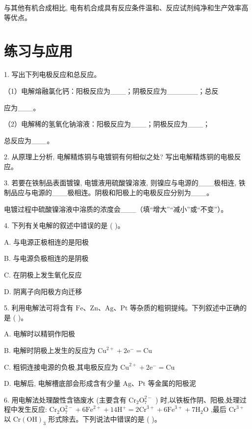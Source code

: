 \documentclass[10pt]{article}
\begin{document}
与其他有机合成相比, 电有机合成具有反应条件温和、反应试剂纯净和生产效率高等优点。

\section*{练习与应用}

1. 写出下列电极反应和总反应。

（1）电解熔融氯化钙：阳极反应为\_\_\_；阴极反应为\_\_\_\_\_\_；总反

应为\_\_\_。

（2）电解稀的氢氧化钠溶液：阳极反应为\_\_\_；阴极反应为\_\_\_；

总反应为\_\_\_。

2. 从原理上分析, 电解精炼铜与电镀铜有何相似之处? 写出电解精炼铜的电极反应。

3. 若要在铁制品表面镀镍, 电镀液用硫酸镍溶液, 则镍应与电源的\_\_\_极相连, 铁制品应与电源的\_\_\_极相连。阴极和阳极上的电极反应分别为\_\_\_。

电镀过程中硫酸镍溶液中溶质的浓度会\_\_\_（填“增大”“减小”或“不变”）。

4. 下列有关电解的叙述中错误的是 ( )。

A. 与电源正极相连的是阳极

B. 与电源负极相连的是阴极

C. 在阴极上发生氧化反应

D. 阴离子向阳极方向迁移

5. 利用电解法可将含有 \(\mathrm{{Fe}}\text{、}\mathrm{{Zn}}\text{、}\mathrm{{Ag}}\text{、}\mathrm{{Pt}}\) 等杂质的粗铜提纯。下列叙述中正确的是 ( )。

A. 电解时以精铜作阳极

B. 电解时阴极上发生的反应为 \({\mathrm{{Cu}}}^{2 + } + 2{\mathrm{e}}^{ - } = \mathrm{{Cu}}\)

C. 粗铜连接电源的负极,其电极反应为 \({\mathrm{{Cu}}}^{2 + } + 2{\mathrm{e}}^{ - } = \mathrm{{Cu}}\)

D. 电解后, 电解槽底部会形成含有少量 \(\mathrm{{Ag}}\text{、}\mathrm{{Pt}}\) 等金属的阳极泥

6. 用电解法处理酸性含铬废水 (主要含有 \({\mathrm{{Cr}}}_{2}{\mathrm{O}}_{7}^{2 - }\) ) 时,以铁板作阴、阳极,处理过程中发生反应: \({\mathrm{{Cr}}}_{2}{\mathrm{O}}_{7}^{2 - } + 6{\mathrm{{Fe}}}^{2 + } + {14}{\mathrm{H}}^{ + } = 2{\mathrm{{Cr}}}^{3 + } + 6{\mathrm{{Fe}}}^{3 + } + 7{\mathrm{H}}_{2}\mathrm{O}\) ,最后 \({\mathrm{{Cr}}}^{3 + }\) 以 \(\mathrm{{Cr}}{\left( \mathrm{{OH}}\right) }_{3}\) 形式除去。下列说法中错误的是 ( )。
\end{document}
